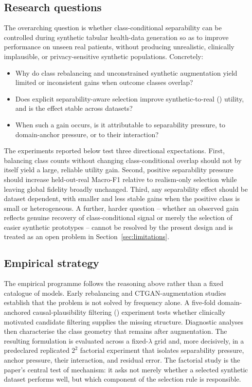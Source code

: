 \subsection{Research questions}

The overarching question is whether class-conditional separability can be controlled during synthetic tabular health-data generation so as to improve performance on unseen real patients, without producing unrealistic, clinically implausible, or privacy-sensitive synthetic populations. Concretely:
\begin{itemize}[leftmargin=*]
\item Why do class rebalancing and unconstrained synthetic augmentation yield limited or inconsistent gains when outcome classes overlap?
\item Does explicit separability-aware selection improve synthetic-to-real (\tstr{}) utility, and is the effect stable across datasets?
\item When such a gain occurs, is it attributable to separability pressure, to domain-anchor pressure, or to their interaction?
\end{itemize}
The experiments reported below test three directional expectations. First, balancing class counts without changing class-conditional overlap should not by itself yield a large, reliable utility gain. Second, positive separability pressure should increase held-out-real Macro-F1 relative to realism-only selection while leaving global fidelity broadly unchanged. Third, any separability effect should be dataset dependent, with smaller and less stable gains when the positive class is small or heterogeneous. A further, harder question -- whether an observed gain reflects genuine recovery of class-conditional signal or merely the selection of easier synthetic prototypes -- cannot be resolved by the present design and is treated as an open problem in Section~\ref{sec:limitations}.

\subsection{Empirical strategy}

The empirical programme follows the reasoning above rather than a fixed catalogue of models. Early rebalancing and CTGAN-augmentation studies establish that the problem is not solved by frequency alone. A five-fold domain-anchored causal-plausibility filtering (\dacpf{}) experiment tests whether clinically motivated candidate filtering supplies the missing structure. Diagnostic analyses then characterise the class geometry that remains after augmentation. The resulting \sepa{} formulation is evaluated across a fixed-$\lambda$ grid and, more decisively, in a predeclared replicated $2^2$ factorial experiment that isolates separability pressure, anchor pressure, their interaction, and residual error. The factorial study is the paper's central test of mechanism: it asks not merely whether a selected synthetic dataset performs well, but which component of the selection rule is responsible.

